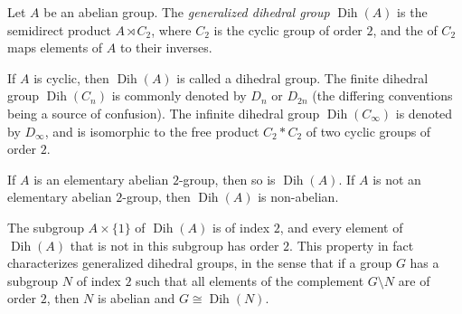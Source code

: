 \documentclass[12pt]{article}
\DeclareMathOperator{\Dih}{Dih}
\def\semidirect{\rtimes}
\begin{document}

Let $A$ be an abelian group.
The \emph{generalized dihedral group} $\Dih(A)$
is the semidirect product $A\semidirect C_2$,
where $C_2$ is the cyclic group of order $2$,
and the  of $C_2$ maps elements of $A$ to their inverses.

If $A$ is cyclic, then $\Dih(A)$ is called a dihedral group.
The finite dihedral group $\Dih(C_n)$ is commonly denoted by $D_n$ or $D_{2n}$
(the differing conventions being a source of confusion).
The infinite dihedral group $\Dih(C_\infty)$ is denoted by $D_\infty$,
and is isomorphic to 
the free product $C_2*C_2$ of two cyclic groups of order $2$.

If $A$ is an elementary abelian $2$-group, then so is $\Dih(A)$.
If $A$ is not an elementary abelian $2$-group, then $\Dih(A)$ is non-abelian.

The subgroup $A\times\{1\}$ of $\Dih(A)$ is of index $2$,
and every element of $\Dih(A)$ that is not in this subgroup has order $2$.
This property in fact characterizes generalized dihedral groups,
in the sense that if a group $G$ has a subgroup $N$ of index $2$ such that all elements of the complement $G\setminus N$ are of order $2$,
then $N$ is abelian and $G\cong \Dih(N)$.
\end{document}
